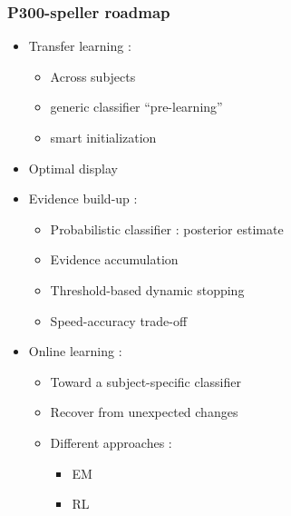 \documentclass{beamer}
\begin{document}
\begin{frame}\frametitle{P300-speller roadmap}
	\vspace{-.5cm}
	\begin{itemize}
		\item Transfer learning \footnotesize{\cite{Kindermans12b, Congedo13}}: 
		\vspace{-.1cm}
		\begin{itemize}
			\item Across subjects 
			\item generic classifier ``pre-learning''
			\item smart initialization
		\end{itemize}
		\item Optimal display
		\item Evidence build-up \footnotesize{\cite{Perrin12,Kindermans2013}}:
		\vspace{-.1cm}
		\begin{itemize}
			\item Probabilistic classifier : posterior estimate
			\item Evidence accumulation
			\item Threshold-based dynamic stopping
			\item Speed-accuracy trade-off
		\end{itemize}
		\item Online learning : 
		\vspace{-.1cm}
		\begin{itemize}
			\item Toward a subject-specific classifier
			\item Recover from unexpected changes
			\item Different approaches :
			\begin{itemize}
				\item EM \footnotesize{\cite{Li06,Kindermans12}}
				\item RL \footnotesize{\cite{Dauce2013}}
			\end{itemize}
		\end{itemize}  
	\end{itemize}
	
\end{frame}
\end{document}

